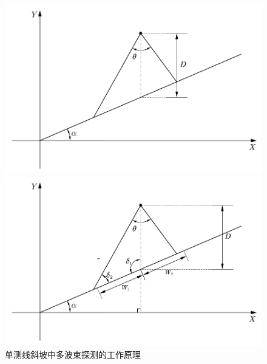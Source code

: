 \documentclass[withoutpreface,bwprint]{cumcmthesis} %
\begin{document}
    \begin{figure}[htbp]
        \centering
        \begin{minipage}[c]{0.48\textwidth}
            \centering
            \includegraphics[height=0.2\textheight]{单波斜面.png}
            \subcaption{}
        \end{minipage}
        \begin{minipage}[c]{0.48\textwidth}
            \centering
            \includegraphics[height=0.2\textheight]{单波斜面标注.png}
            \subcaption{}
        \end{minipage}
        \caption{单测线斜坡中多波束探测的工作原理}
        \label{3}
    \end{figure}
\end{document}
